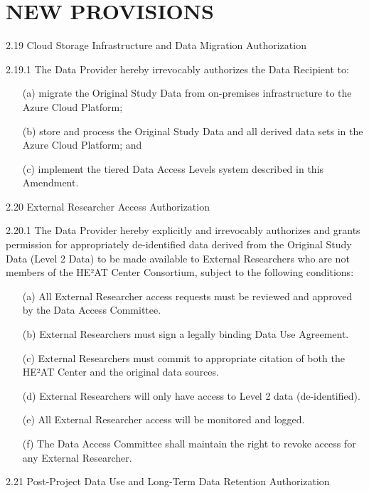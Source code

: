 \documentclass[12pt,letterpaper]{article}
\newcommand{\added}[1]{\textcolor{addcolor}{#1}}
\begin{document}
\section{NEW PROVISIONS}

\added{2.19 Cloud Storage Infrastructure and Data Migration Authorization}

\added{2.19.1 The Data Provider hereby irrevocably authorizes the Data Recipient to:
\begin{itemize}
\item[(a)] migrate the Original Study Data from on-premises infrastructure to the Azure Cloud Platform;
\item[(b)] store and process the Original Study Data and all derived data sets in the Azure Cloud Platform; and
\item[(c)] implement the tiered Data Access Levels system described in this Amendment.
\end{itemize}}

\added{2.20 External Researcher Access Authorization}

\added{2.20.1 The Data Provider hereby explicitly and irrevocably authorizes and grants permission for appropriately de-identified data derived from the Original Study Data (Level 2 Data) to be made available to External Researchers who are not members of the HE²AT Center Consortium, subject to the following conditions:
\begin{itemize}
\item[(a)] All External Researcher access requests must be reviewed and approved by the Data Access Committee.
\item[(b)] External Researchers must sign a legally binding Data Use Agreement.
\item[(c)] External Researchers must commit to appropriate citation of both the HE²AT Center and the original data sources.
\item[(d)] External Researchers will only have access to Level 2 data (de-identified).
\item[(e)] All External Researcher access will be monitored and logged.
\item[(f)] The Data Access Committee shall maintain the right to revoke access for any External Researcher.
\end{itemize}}

\added{2.21 Post-Project Data Use and Long-Term Data Retention Authorization}
\end{document}
